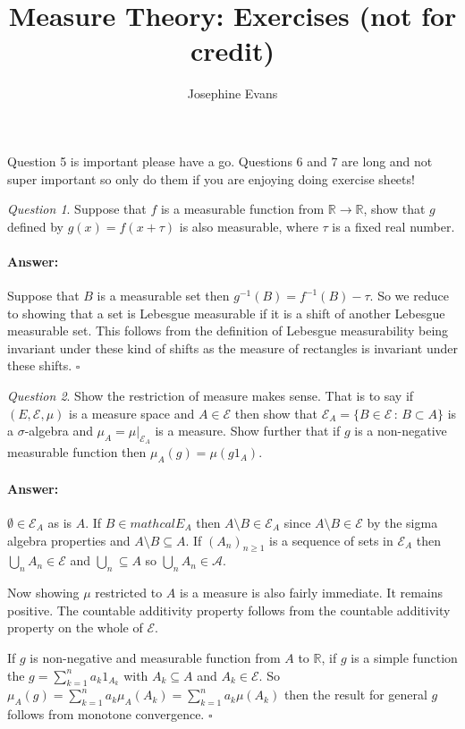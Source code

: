 \documentclass[11pt]{article}
\author{
Josephine Evans
}
\title{Measure Theory: Exercises (not for credit)}
\theoremstyle{definition}
\theoremstyle{remark}
\newtheorem{q}{Question}
\newenvironment{ans}{\paragraph{Answer:}}{\hfill$\square$\vspace{10pt}}
\begin{document}
\maketitle
Question 5 is important please have a go. Questions 6 and 7 are long and not super important so only do them if you are enjoying doing exercise sheets!

\begin{q}
Suppose that $f$ is a measurable function from $\mathbb{R} \rightarrow \mathbb{R}$, show that $g$ defined by $g(x) = f(x+\tau)$ is also measurable, where $\tau$ is a fixed real number.
\end{q}
\begin{ans}
Suppose that $B$ is a measurable set then $g^{-1}(B) = f^{-1}(B) - \tau$. So we reduce to showing that a set is Lebesgue measurable if it is a shift of another Lebesgue measurable set. This follows from the definition of Lebesgue measurability being invariant under these kind of shifts as the measure of rectangles is invariant under these shifts.
\end{ans}

\begin{q}
Show the restriction of measure makes sense. That is to say if $(E, \mathcal{E}, \mu)$ is a measure space and $A \in \mathcal{E}$ then show that $\mathcal{E}_A = \{ B  \in \mathcal{E} \,:\, B \subset A\}$ is a $\sigma$-algebra and $\mu_A = \mu|_{\mathcal{E}_A}$ is a measure. Show further that if $g$ is a non-negative measurable function then $\mu_A(g) = \mu(g1_A)$. 
\end{q}
\begin{ans}
$\emptyset \in \mathcal{E}_A$ as is $A$. If $B \in mathcal{E}_A$ then $A \setminus B \in \mathcal{E}_A$ since $A \setminus B \in \mathcal{E}$ by the sigma algebra properties and $A \setminus B \subseteq A$. If $(A_n)_{n \geq 1}$ is a sequence of sets in $\mathcal{E}_A$ then $\bigcup_n A_n \in \mathcal{E}$ and $\bigcup_n \subseteq A$ so $\bigcup_n A_n \in \mathcal{A}$.

Now showing $\mu$ restricted to $A$ is a measure is also fairly immediate. It remains positive. The countable additivity property follows from the countable additivity property on the whole of $\mathcal{E}$.

If $g$ is non-negative and measurable function from $A$ to $\mathbb{R}$, if $g$ is a simple function the $g = \sum_{k=1}^n a_k 1_{A_k}$ with $A_k \subseteq A$ and $A_k \in \mathcal{E}$. So $\mu_A(g) = \sum_{k=1}^n a_k \mu_A(A_k) = \sum_{k=1}^n a_k \mu(A_k)$ then the result for general $g$ follows from monotone convergence.
\end{ans}
\end{document}
